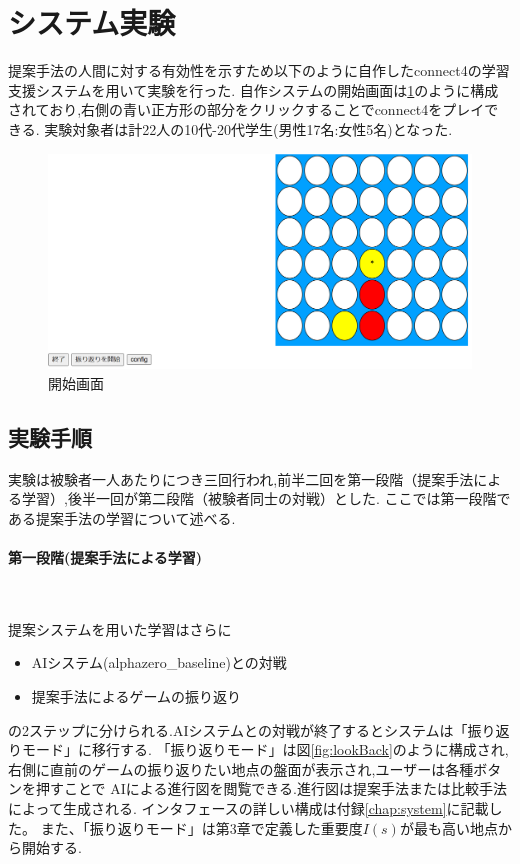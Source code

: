 \section{システム実験}
提案手法の人間に対する有効性を示すため以下のように自作したconnect4の学習支援システムを用いて実験を行った.
自作システムの開始画面は\ref{fig:basic}のように構成されており,右側の青い正方形の部分をクリックすることでconnect4をプレイできる.
実験対象者は計22人の10代-20代学生(男性17名:女性5名)となった.
\begin{figure}[t]
	\centering
	\includegraphics[width=\linewidth]{./figure/basicSystem.png}
	\caption{開始画面}
	\label{fig:basic}
\end{figure}
\subsection{実験手順}
実験は被験者一人あたりにつき三回行われ,前半二回を第一段階（提案手法による学習）,後半一回が第二段階（被験者同士の対戦）とした.
ここでは第一段階である提案手法の学習について述べる.
\newpage
\paragraph{第一段階(提案手法による学習)}~
\par 提案システムを用いた学習はさらに
\begin{itemize}
	\item AIシステム(alphazero\_baseline)との対戦
	\item 提案手法によるゲームの振り返り
\end{itemize}
の2ステップに分けられる.AIシステムとの対戦が終了するとシステムは「振り返りモード」に移行する.
「振り返りモード」は図\ref{fig:lookBack}のように構成され,右側に直前のゲームの振り返りたい地点の盤面が表示され,ユーザーは各種ボタンを押すことで
AIによる進行図を閲覧できる.進行図は提案手法または比較手法によって生成される.
インタフェースの詳しい構成は付録\ref{chap:system}に記載した。
また、「振り返りモード」は第3章で定義した重要度$I(s)$が最も高い地点から開始する.

